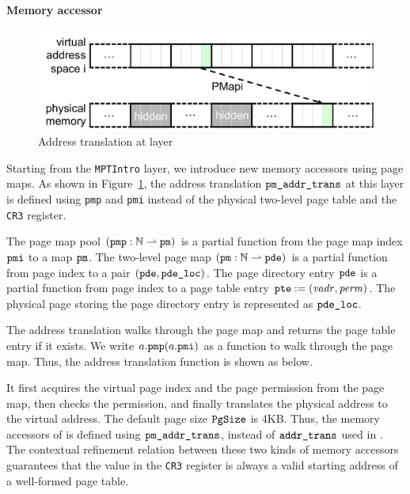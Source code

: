 \paragraph{Memory accessor}

\begin{figure}[t]\centering
\includegraphics[scale=.55]{figs/mem_model_2} 
\caption{Address translation at  layer}
\label{fig:seq:mem2}
\hrulefill
\end{figure}

Starting from the \verb"MPTIntro" layer, we 
introduce new memory accessors
using page maps.
As shown in Figure~\ref{fig:seq:mem2},
the
address translation $\code{pm\_addr\_trans}$ at this layer is defined
using \verb"pmp" and \verb"pmi" instead of the physical two-level page
table and the \verb"CR3" register. 

The page map pool $(\code{pmp}: \integer\partialf \code{pm})$
is a partial function from the page map index $\code{pmi}$
to a map $\code{pm}$.
The  two-level page map $(\code{pm} : \integer\partialf \code{pde})$
is a partial function  from page index to a pair 
$(\code{pde}, \code{pde\_loc})$.
The page directory entry 
$\code{pde}$
is a partial function from page index to a page table entry
$\code{pte}:=(\mathit{vadr}, \mathit{perm})$.
The physical page storing
the page directory entry is represented
as $\code{pde\_loc}$.

The address translation walks through
the page map and returns the page table entry if it exists.
We write $a.\code{pmp}(a.\code{pmi})$ as a function to walk
through the page map.
Thus, the address translation function is shown as below.
\begin{mathpar}
\end{mathpar}
It first acquires the virtual page index and the page permission
from the page map,
then checks the permission,
and finally translates the physical address
to the virtual address.
The default page size $\code{PgSize}$ is 4KB.
Thus, the memory accessors of  is defined
using $\code{pm\_addr\_trans}$, instead of
$\code{addr\_trans}$ used in .
 The contextual refinement relation
between these two kinds of memory accessors guarantees that the
value in the \verb"CR3" register is always a valid starting address of
a well-formed page table.



